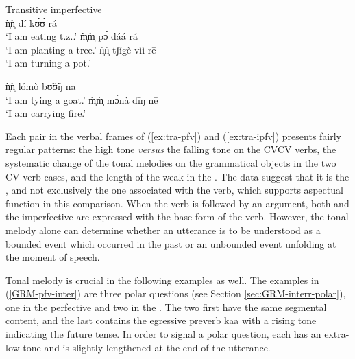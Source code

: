 \begin{exe}
\begin{exe}
\begin{exe}
\begin{exe}
\begin{exe}
\begin{exe}
\begin{exe}
\begin{exe}
\begin{exe}
\begin{exe}
\begin{exe}
\z 
 \z

\ea\label{ex:tra-ipfv}{\rm Transitive imperfective}\\

 \ea\label{ex:tra-ipfv-eat}
ǹ̩ǹ̩ dí kʊ́ʊ́ rá\\
{\rm `I am eating {\sc t.z.}.'}
 \ex\label{ex:tra-ipfv-plant}
m̩̀m̩̀ pɔ́ dáá rá\\
{\rm `I am planting a {\sc  tree}.'} 
 \ex\label{ex:tra-ipfv-cover}
ǹ̩ǹ̩ tʃígè vìì rē\\
{\rm `I am turning  a {\sc pot}.'} 

 \ex\label{ex:tra-ipfv-tie}
ǹ̩ǹ̩ lómò bʊ̃̄ʊ̃̄ŋ nā\\
{\rm `I am tying  a {\sc goat}.'} 
 \ex\label{ex:tra-ipfv-carry}
m̩̀m̩̀ mɔ́nà dīŋ nē\\
{\rm `I am carrying  {\sc fire}.'}

\z 
 \z
 


Each pair in the verbal frames of  (\ref{ex:tra-pfv}) and (\ref{ex:tra-ipfv}) presents fairly regular patterns:  the high tone {\it versus} the falling tone on the CVCV verbs, the systematic change of the tonal melodies on the grammatical objects in the two CV-verb cases, and the length of the weak   in the . The data suggest that it is the , and not exclusively the one associated with the verb, which supports aspectual function in this comparison. When the verb is followed by an argument, both  and the imperfective are expressed with the base form of the verb.  However,  the tonal melody alone  can determine whether an utterance is to be understood as a bounded event which occurred in the past or an unbounded event unfolding at the moment of speech.



Tonal melody is crucial in the following examples as well. The examples in (\ref{GRM-pfv-inter}) are three polar questions (see Section \ref{sec:GRM-interr-polar}), one in the perfective and two in the . The two first have the same segmental content, and the last contains the egressive preverb {\sls kaa} with a rising tone indicating the future tense.  In order to signal a polar question, each has  an extra-low tone and is slightly lengthened at the end of the utterance. 

\ea\label{GRM-pfv-inter}



\end{exe}
\end{exe}
\end{exe}
\end{exe}
\end{exe}
\end{exe}
\end{exe}
\end{exe}
\end{exe}
\end{exe}
\end{exe}
